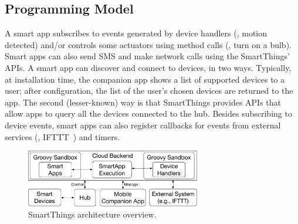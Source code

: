 \subsection{Programming Model}
A smart app subscribes to events generated by device handlers (\eg, motion detected)
and/or controls some actuators using method calls (\eg, turn on a bulb).
Smart apps can also send SMS and make network calls using the SmartThings' APIs.
A smart app can discover and connect to devices, in two ways.
Typically, at installation time,
the companion app shows a list of supported devices to a user;
after configuration,
the list of the user's chosen devices are returned to the app.
The second (lesser-known) way is that SmartThings
provides APIs that allow apps to query all the devices connected to the hub.
Besides subscribing to device events, smart apps can also register callbacks
for events from external services (\eg, IFTTT~\cite{iftttpage}) and timers.

\begin{figure}[t]
\begin{center}
\includegraphics[width=3.0in]{SmartThingsArchitecture}
\caption{SmartThings architecture overview.}
\label{SmartThingsArchitecture}
\end{center}
\end{figure}

